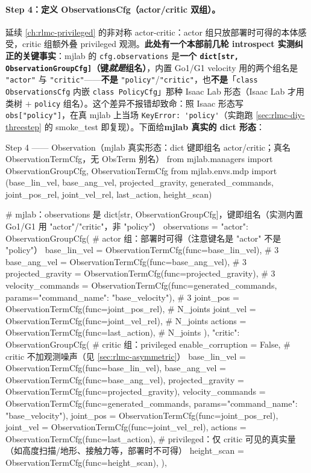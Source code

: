 \paragraph{Step 4：定义 ObservationsCfg（actor/critic 双组）。}延续 \cref{ch:rlmc-privileged} 的非对称 actor-critic：actor 组只放部署时可得的本体感受，critic 组额外叠 privileged 观测。\textbf{此处有一个本部前几轮 introspect 实测纠正的关键事实}：mjlab 的 \verb|cfg.observations| 是\textbf{一个 \texttt{dict[str, ObservationGroupCfg]}（键\emph{就是}组名）}，内置 Go1/G1 velocity 用的两个组名是 \verb|"actor"| 与 \verb|"critic"|——\textbf{不是} \verb|"policy"|/\verb|"critic"|，也\textbf{不是}「\verb|class ObservationsCfg| 内嵌 \verb|class PolicyCfg|」那种 Isaac Lab 形态（Isaac Lab 才用类树 $+$ \verb|policy| 组名）。这个差异不报错却致命：照 Isaac 形态写 \verb|obs["policy"]|，在真 mjlab 上当场 \verb|KeyError: 'policy'|（实跑跑 \cref{sec:rlmc-diy-threestep} 的 smoke\_test 即复现）。下面给\textbf{mjlab 真实的 dict 形态}：

\begin{codebox}[Python]{Step 4 —— Observation（mjlab 真实形态：dict 键即组名 actor/critic；真名 ObservationTermCfg，无 ObsTerm 别名）}
from mjlab.managers import ObservationGroupCfg, ObservationTermCfg
from mjlab.envs.mdp import (base_lin_vel, base_ang_vel, projected_gravity,
                            generated_commands, joint_pos_rel, joint_vel_rel,
                            last_action, height_scan)

# mjlab：observations 是 dict[str, ObservationGroupCfg]，键即组名（实测内置 Go1/G1 用 "actor"/"critic"，非 "policy"）
observations = {
    "actor": ObservationGroupCfg(                # actor 组：部署时可得（注意键名是 "actor" 不是 "policy"）
        base_lin_vel      = ObservationTermCfg(func=base_lin_vel),       # 3
        base_ang_vel      = ObservationTermCfg(func=base_ang_vel),       # 3
        projected_gravity = ObservationTermCfg(func=projected_gravity),  # 3
        velocity_commands = ObservationTermCfg(func=generated_commands,
                                    params={"command_name": "base_velocity"}),  # 3
        joint_pos = ObservationTermCfg(func=joint_pos_rel),             # N_joints
        joint_vel = ObservationTermCfg(func=joint_vel_rel),             # N_joints
        actions   = ObservationTermCfg(func=last_action),               # N_joints
    ),
    "critic": ObservationGroupCfg(               # critic 组：privileged
        enable_corruption = False,               # critic 不加观测噪声（见 \cref{sec:rlmc-asymmetric}）
        base_lin_vel      = ObservationTermCfg(func=base_lin_vel),
        base_ang_vel      = ObservationTermCfg(func=base_ang_vel),
        projected_gravity = ObservationTermCfg(func=projected_gravity),
        velocity_commands = ObservationTermCfg(func=generated_commands,
                                    params={"command_name": "base_velocity"}),
        joint_pos = ObservationTermCfg(func=joint_pos_rel),
        joint_vel = ObservationTermCfg(func=joint_vel_rel),
        actions   = ObservationTermCfg(func=last_action),
        # privileged：仅 critic 可见的真实量（如高度扫描/地形、接触力等，部署时不可得）
        height_scan = ObservationTermCfg(func=height_scan),
    ),
}
\end{codebox}

